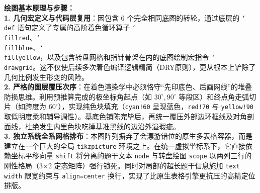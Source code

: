 \vspace{0.6cm}

{\small\color{blue!70!black}
\textbf{绘图基本原理与步骤：}\\
\textbf{1. 几何宏定义与代码层复用}：因包含 $6$ 个完全相同底图的转轮，通过底层的 \texttt{\char`\\def} 语句定义了专属的高阶着色循环算子 \texttt{\char`\\fillred}、\texttt{\char`\\fillblue}、\texttt{\char`\\fillyellow}，以及包含转盘网格和指针骨架在内的底图绘制宏指令 \texttt{\char`\\drawgrid}。这不仅使后续多次着色编译逻辑精简（DRY原则），更从根本上铲除了几何比例发生形变的风险。\\
\textbf{2. 严格的图层覆压次序}：在着色渲染学中必须恪守“先印底色、后画网线”的堆叠防损思维。利用预推算完成的极坐标角起点（如 $30^\circ, 90^\circ$ 等段区）和终点角走弧切片（如跨度为 $60^\circ$），实现纯色块填充（\texttt{cyan!60} 呈现蓝色，\texttt{red!70} 与 \texttt{yellow!90} 取低明度柔和辅导调性）。基底色铺陈完毕后，再统一覆压外部边环框线及对角剖面线，杜绝发生内里色块吃掉基准黑线的边沿外溢瑕疵。\\
\textbf{3. 独立系统全系网格排布}：本图阵列摒弃了会漂游错位的原生多表格容器，而是建立在一个巨大的全局 \texttt{tikzpicture} 环境之上。在统一虚拟坐标系下，它直接依赖坐标平移向量 \texttt{shift} 将分离的题干文本 \texttt{node} 与转盘绘图 \texttt{scope} 以两列三行的刚性格局（3$\times$2 定态矩阵）强行锁死。同时对局部的超长题干信息施加 \texttt{text width} 限宽约束与 \texttt{align=center} 换行，实现了比原生表格引擎更抗压的高精定位排版。
}


\newpage


